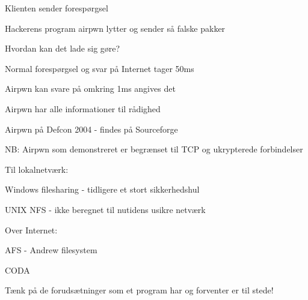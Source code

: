 




\begin{list1}
\item Klienten sender forespørgsel
\item Hackerens program airpwn lytter og sender så falske pakker
\item Hvordan kan det lade sig gøre?
\begin{list2}
\item Normal forespørgsel og svar på Internet tager 50ms
\item Airpwn kan svare på omkring 1ms angives det
\item Airpwn har alle informationer til rådighed      
\end{list2}
\item Airpwn på Defcon 2004 - findes på Sourceforge\\
\item NB: Airpwn som demonstreret er begrænset til TCP og ukrypterede
  forbindelser 
\end{list1}





\begin{list1}
\item Til lokalnetværk:
  \begin{list2}
\item Windows filesharing - tidligere et stort sikkerhedshul
\item UNIX NFS - ikke beregnet til nutidens usikre netværk
\end{list2}
\item Over Internet: 
\item AFS - Andrew filesystem\\
\item CODA 
\item Tænk på de forudsætninger som et program har og forventer er til
  stede! 
\end{list1}


